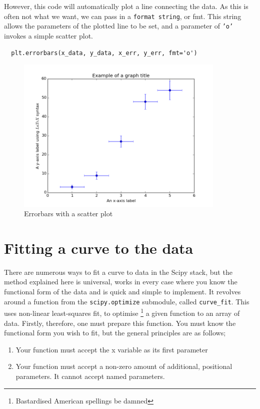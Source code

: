 \documentclass{article}
\begin{document}
However, this code will automatically plot a line connecting the
data. As this is often not what we want, we can pass in a
\texttt{format string}, or fmt. This string allows the parameters of
the plotted line to be set, and a parameter of \texttt{'o'}
invokes a simple scatter plot.

\begin{lstlisting}
  plt.errorbars(x_data, y_data, x_err, y_err, fmt='o')
\end{lstlisting}

\begin{figure}[H]
  \centering
  \includegraphics[width=10cm]{ch3_2}
  \caption{Errorbars with a scatter plot}
  \label{fig:ch3_2}
\end{figure}

\section{Fitting a curve to the data}
There are numerous ways to fit a curve to data in the Scipy stack, but
the method explained here is universal, works in every case where you
know the functional form of the data and is quick and simple to
implement. It revolves around a function from the
\texttt{scipy.optimize} submodule, called \texttt{curve\_fit}. This
uses non-linear least-squares fit, to optimise \footnote{Bastardised
  American spellings be damned} a given function to an array of
data. Firstly, therefore, one must prepare this function. You must
know the functional form you wish to fit, but the general principles
are as follows;

\begin{enumerate}
\item Your function must accept the x variable as its first parameter
\item Your function must accept a non-zero amount of additional,
  positional parameters. It cannot accept named parameters.
\end{enumerate}
\end{document}
